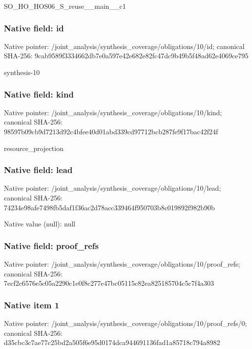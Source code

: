 \documentclass[10pt,a4paper]{article}
\begin{document}
\begingroup\raggedright\sloppy SO\_\allowbreak{}HO\_\allowbreak{}HOS06\_\allowbreak{}S\_\allowbreak{}reuse\_\allowbreak{}\_\allowbreak{}main\_\allowbreak{}\_\allowbreak{}c1\par\endgroup

\subsubsection{Native field: id}
Native pointer: /joint\_\allowbreak{}analysis/synthesis\_\allowbreak{}coverage/obligations/10/id; canonical SHA-256: 9cab9589f3334662db7e0a597e42e682e82fc47dc9b49b5f48ad62e4069ce795

\begingroup\raggedright\sloppy synthesis-10\par\endgroup

\subsubsection{Native field: kind}
Native pointer: /joint\_\allowbreak{}analysis/synthesis\_\allowbreak{}coverage/obligations/10/kind; canonical SHA-256: 98597b09cb9d7213d92c4bfee40d01abd339cd97712bcb287fe9f17bac42f24f

\begingroup\raggedright\sloppy resource\_\allowbreak{}projection\par\endgroup

\subsubsection{Native field: lead}
Native pointer: /joint\_\allowbreak{}analysis/synthesis\_\allowbreak{}coverage/obligations/10/lead; canonical SHA-256: 74234e98afe7498fb5daf1f36ac2d78acc339464f950703b8c019892f982b90b

Native value (null): null

\subsubsection{Native field: proof\_\allowbreak{}refs}
Native pointer: /joint\_\allowbreak{}analysis/synthesis\_\allowbreak{}coverage/obligations/10/proof\_\allowbreak{}refs; canonical SHA-256: 7ecf2c6576e5c05a2290c1e0f8c277e47bc05115c82ea825185704c5c7f4a303

\subsubsection{Native item 1}
Native pointer: /joint\_\allowbreak{}analysis/synthesis\_\allowbreak{}coverage/obligations/10/proof\_\allowbreak{}refs/0; canonical SHA-256: d35cbc3c7ae77c25bd2a505f6e95d0174dca944691136fad1a85718c794a8982
\end{document}
